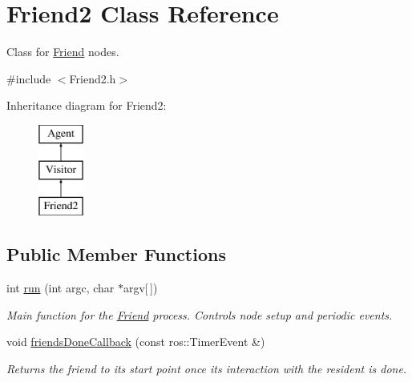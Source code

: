 \hypertarget{classFriend2}{\section{Friend2 Class Reference}
\label{classFriend2}
}


Class for \hyperlink{classFriend}{Friend} nodes.  




{\ttfamily \#include $<$Friend2.\-h$>$}

Inheritance diagram for Friend2\-:\begin{figure}[H]
\begin{center}
\leavevmode
\includegraphics[height=3.000000cm]{classFriend2}
\end{center}
\end{figure}
\subsection*{Public Member Functions}
\begin{DoxyCompactItemize}
\item 
\hypertarget{classFriend2_ad03c02e64256ea572ca3dfbf4bba0d0e}{int \hyperlink{classFriend2_ad03c02e64256ea572ca3dfbf4bba0d0e}{run} (int argc, char $\ast$argv\mbox{[}$\,$\mbox{]})}\label{classFriend2_ad03c02e64256ea572ca3dfbf4bba0d0e}

\begin{DoxyCompactList}\small\item\em Main function for the \hyperlink{classFriend}{Friend} process. Controls node setup and periodic events. \end{DoxyCompactList}\item 
\hypertarget{classFriend2_a4d8cfc5c44393e2353349197894d8393}{void \hyperlink{classFriend2_a4d8cfc5c44393e2353349197894d8393}{friends\-Done\-Callback} (const ros\-::\-Timer\-Event \&)}\label{classFriend2_a4d8cfc5c44393e2353349197894d8393}

\begin{DoxyCompactList}\small\item\em Returns the friend to its start point once its interaction with the resident is done. \end{DoxyCompactList}\end{DoxyCompactItemize}
